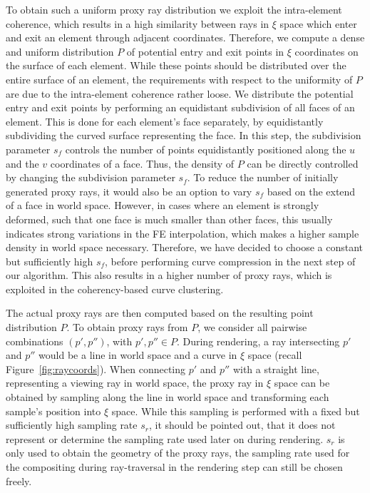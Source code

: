 \documentclass[review,journal]{vgtc}         %
\begin{document}
To obtain such a uniform proxy ray distribution we exploit the intra-element coherence, which results in a high similarity between rays in $\xi$ space which enter and exit an element through adjacent coordinates. Therefore, we compute a dense and uniform distribution $P$ of potential entry and exit points in $\xi$ coordinates on the surface of each element. While these points should be distributed over the entire surface of an element, the requirements with respect to the uniformity of $P$ are due to the intra-element coherence rather loose. We distribute the potential entry and exit points by performing an equidistant subdivision of all faces of an element. This is done for each element's face separately, by equidistantly subdividing the curved surface representing the face. In this step, the subdivision parameter $s_f$ controls the number of points equidistantly positioned along the $u$ and the $v$ coordinates of a face. Thus, the density of $P$ can be directly controlled by changing the subdivision parameter $s_f$. To reduce the number of initially generated proxy rays, it would also be an option to vary $s_f$ based on the extend of a face in world space. However, in cases where an element is strongly deformed, such that one face is much smaller than other faces, this usually indicates strong variations in the FE interpolation, which makes a higher sample density in world space necessary. Therefore, we have decided to choose a constant but sufficiently high $s_f$, before performing curve compression in the next step of our algorithm. This also results in a higher number of proxy rays, which is exploited in the coherency-based curve clustering.

The actual proxy rays are then computed based on the resulting point distribution $P$. To obtain proxy rays from $P$, we consider all pairwise combinations $(p',p'')$, with $p',p'' \in P$. During rendering, a ray intersecting $p'$ and $p''$ would be a line in world space and a curve in $\xi$ space (recall Figure~\ref{fig:raycoords}). When connecting $p'$ and $p''$ with a straight line, representing a viewing ray in world space, the proxy ray in $\xi$ space can be obtained by sampling along the line in world space and transforming each sample's position into $\xi$ space. While this sampling is performed with a fixed but sufficiently high sampling rate $s_r$, it should be pointed out, that it does not represent or determine the sampling rate used later on during rendering. $s_r$ is only used to obtain the geometry of the proxy rays, the sampling rate used for the compositing during ray-traversal in the rendering step can still be chosen freely.
\end{document}
